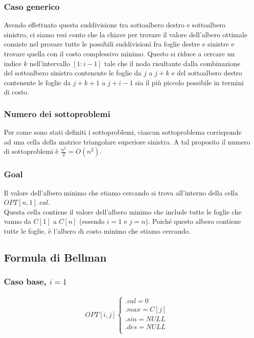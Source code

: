 \subsubsection*{Caso generico}

Avendo effettuato questa suddivisione tra sottoalbero destro e sottoalbero sinistro, ci siamo resi conto che la chiave per trovare il valore dell'albero 
ottimale consiste nel provare tutte le possibili suddivisioni fra foglie destre e sinistre e trovare quella con il costo complessivo minimo. Questo si riduce a 
cercare un indice $k$ nell'intervallo $[1 : i - 1]$ tale che il nodo risultante dalla combinazione del sottoalbero sinistro contenente le foglie da $j$ a $j + k$ e del 
sottoalbero destro contenente le foglie da $j + k +1$ a $j + i - 1$ sia il più piccolo possibile in termini di costo.

\newpage
\subsubsection*{Numero dei sottoproblemi}

Per come sono stati definiti i sottoproblemi, ciascun sottoproblema corrisponde ad una cella della matrice triangolare superiore sinistra. A tal proposito 
il numero di sottoproblemi è $\frac{n^2}{2} = O(n^2)$. 

\subsubsection*{Goal}

Il valore dell'albero minimo che stiamo cercando si trova all'interno della cella $OPT[n,1].val$.\\
Questa cella contiene il valore dell'albero minimo che include tutte le foglie che vanno da 
$C[1]$ a $C[n]$ (essendo $i = 1$ e $j = n$). 
Poiché questo albero contiene tutte le foglie, è l'albero di costo minimo che stiamo cercando.


\subsection{Formula di Bellman}

\subsubsection*{Caso base, $i = 1$}

\begin{align*}
	OPT[i, j]	
	\begin{cases}
		.val = 0\\                                                                                          
		.max = C[j]\\
		.sin = NULL\\
		.des = NULL\\
	\end{cases}                                                                                            
\end{align*}


